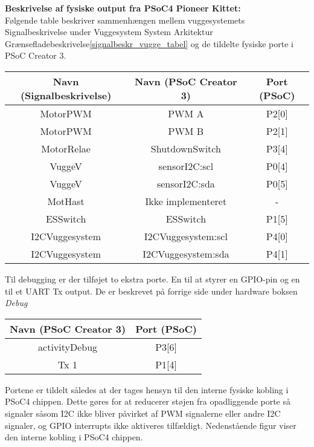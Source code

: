 \textbf{Beskrivelse af fysiske output fra PSoC4 Pioneer Kittet:} \\
Følgende table beskriver sammenhængen mellem vuggesystemets Signalbeskrivelse under Vuggesystem System Arkitektur Grænsefladebeskrivelse\vref{signalbeskr_vugge_tabel} og de tildelte fysiske porte i PSoC Creator 3.
\begin{center}
    \begin{tabular}{| c | c | c |}
    \hline
    \textbf{Navn (Signalbeskrivelse)}	& \textbf{Navn (PSoC Creator 3)} & \textbf{Port (PSoC)} \\ \hline
    MotorPWM & PWM A & P2[0] \\ \hline
    MotorPWM & PWM B & P2[1] \\ \hline
    MotorRelae & ShutdownSwitch & P3[4] \\ \hline
    VuggeV & sensorI2C:scl & P0[4] \\ \hline
    VuggeV & sensorI2C:sda & P0[5] \\ \hline
    MotHast & Ikke implementeret & - \\ \hline
    ESSwitch & ESSwitch & P1[5] \\ \hline
    I2CVuggesystem & I2CVuggesystem:scl & P4[0] \\ \hline
    I2CVuggesystem & I2CVuggesystem:sda & P4[1] \\
  	\hline
    \end{tabular}
\end{center}
Til debugging er der tilføjet to ekstra porte. En til at styrer en GPIO-pin og en til et UART Tx output. De er beskrevet på forrige side under hardware boksen \textit{Debug}
\begin{center}
    \begin{tabular}{| c | c |}
    \hline
    \textbf{Navn (PSoC Creator 3)} & \textbf{Port (PSoC)} \\ \hline
    activityDebug & P3[6] \\ \hline
    Tx 1 & P1[4] \\
  	\hline
    \end{tabular}
\end{center}
Portene er tildelt således at der tages hensyn til den interne fysiske kobling i PSoC4 chippen. Dette gøres for at reducerer støjen fra opadliggende porte så signaler såsom I2C ikke bliver påvirket af PWM signalerne eller andre I2C signaler, og GPIO interrupts ikke aktiveres tilfældigt. Nedenstående figur viser den interne kobling i PSoC4 chippen.




